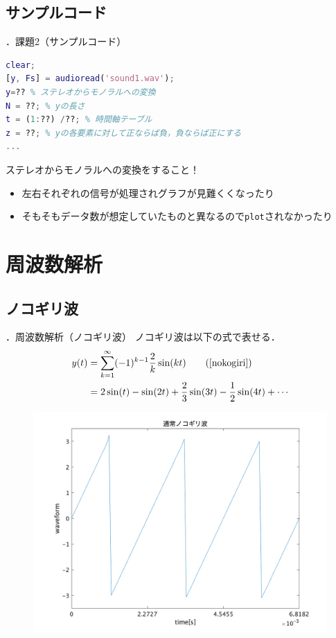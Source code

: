 \documentclass[aspectratio=43]{beamer}
\newcommand{\showsec}{\thesection ．}
\begin{document}
\subsection{サンプルコード}
\begin{frame}[t,containsverbatim]{\showsec 課題2（サンプルコード）}
    \begin{lstlisting}[language={Matlab}]
clear;
[y, Fs] = audioread('sound1.wav');
y=?? % ステレオからモノラルへの変換
N = ??; % yの長さ
t = (1:??) /??; % 時間軸テーブル
z = ??; % yの各要素に対して正ならば負，負ならば正にする
...
    \end{lstlisting}
    \begin{alertblock}{}
        ステレオからモノラルへの変換をすること！
        \begin{itemize}
            \item 左右それぞれの信号が処理されグラフが見難くくなったり
            \item そもそもデータ数が想定していたものと異なるので\texttt{plot}されなかったり
        \end{itemize}
    \end{alertblock}
\end{frame}
\section{周波数解析}
\subsection{ノコギリ波}
\begin{frame}[t]{\showsec 周波数解析（ノコギリ波）}
    ノコギリ波は以下の式で表せる．
    \begin{align}
        y(t) & = \sum_{k=1}^{\infty}(-1)^{k-1}\dfrac{2}{k}\sin(kt)\tag{\ref{nokogiri}}    \\
             & = 2\sin(t) - \sin(2t) + \frac{2}{3}\sin(3t) - \frac{1}{2}\sin(4t) + \cdots
    \end{align}
    \begin{figure}
        \includegraphics[keepaspectratio,height=0.5\textheight]{nokogiri.png}
    \end{figure}
\end{frame}
\end{document}
